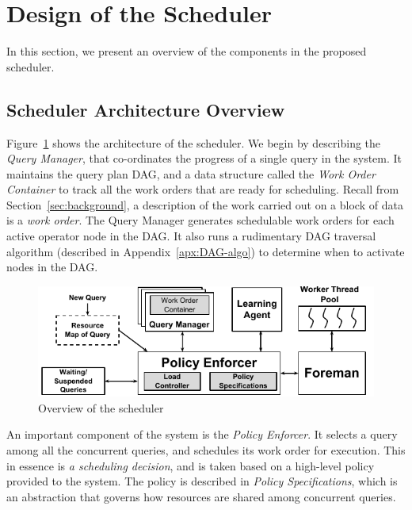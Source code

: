 \section{Design of the Scheduler}\label{sec:design}
In this section, we present an overview of the components in the proposed \sys{} scheduler.

\subsection{Scheduler Architecture Overview}\label{ssec:scheduler-arch}
Figure~\ref{fig:scheduler-architecture} shows the architecture of the \sys{} scheduler.
We begin by describing the \textit{Query Manager}, that co-ordinates the progress of a single query in the system.
It maintains the query plan DAG, and a data structure called
the \textit{Work Order Container} to track all the work orders that are ready for
scheduling. 
Recall from Section~\ref{sec:background}, a description of the work carried out on a block of data is a \textit{work order}. 
The Query Manager generates schedulable work orders for each active operator node in the DAG. 
It also runs a rudimentary DAG traversal algorithm (described in Appendix~\ref{apx:DAG-algo}) to determine when to activate nodes in the DAG. 

\begin{figure}[]
	\centering
	\includegraphics[width=\columnwidth]{figures/Scheduler-Architecture.pdf}
	\vspace*{-1.5em}
	\caption{Overview of the scheduler}
	\label{fig:scheduler-architecture}
	\vspace*{-1.5em}
\end{figure}

An important component of the system is the \textit{Policy Enforcer}.
It selects a query among all the concurrent queries, and schedules its work order for execution. 
This in essence is \textit{a scheduling decision}, and is taken based on a high-level policy provided to the system.
The policy is described in \textit{Policy Specifications}, which is an
abstraction that governs how resources are shared among concurrent queries. 

